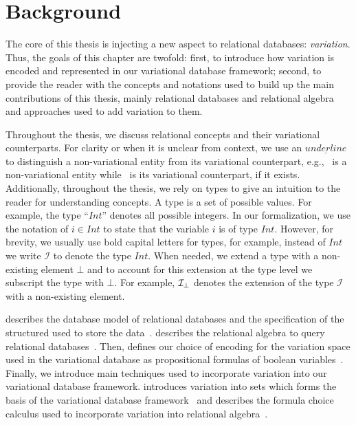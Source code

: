 \chapter{Background}
\label{ch:bg}

The core of this thesis is injecting a new aspect to relational databases: \emph{variation}.
Thus, the goals of this chapter are twofold: 
%
first, to introduce how variation is encoded and represented in our variational database framework;
%
second, to provide the reader with the concepts and notations
used to build up the main contributions of this thesis, mainly relational databases and
relational algebra
%
and approaches used to add variation to them.

%
Throughout the thesis, we discuss relational concepts and their
variational counterparts. 
For clarity or when it is unclear from context, we use
an $\underline{underline}$ to distinguish a non-variational entity
from its variational counterpart,
e.g., \pElem\ is a 
non-variational entity while \elem\ is its variational counterpart,
if it exists.
%
Additionally, throughout the thesis, we rely on types to give an intuition to the reader for
understanding concepts. A type is a set of possible values. For example, the type ``$\mathit{Int}$''
denotes all possible integers. In our formalization, we use the notation of $i \in \mathit{Int}$ to
state that the variable $i$ is of type $\mathit{Int}$. However, for brevity, we usually use 
bold capital letters for types, for example, instead of $\mathit{Int}$ we write $\mathcal{I}$ to denote the type $\mathit{Int}$.
%
When needed, we extend a type with a non-existing element $\bot$ and to account for this
extension at the type level we subscript the type with $\bot$. For example, $\maybe {\mathcal{I}}$
denotes the extension of the type $\mathcal{I}$ with a non-existing element.


%
 describes the database model of relational databases and the specification of
the structured used to store the data~\cite{AliceBook}. 
 describes the relational algebra to query relational databases~\cite{AliceBook}.
%
Then, 
 defines our choice of encoding for the variation space used in the 
variational database as propositional formulas of boolean variables~\cite{ATW18poly,ATW17dbpl}.
%
Finally, we introduce main techniques used to incorporate variation into our variational 
database framework.
 introduces variation into sets which forms the basis of the variational database
framework~\cite{EWC13fosd,Walk14onward,ATW17dbpl} 
and  describes the formula choice calculus used to incorporate 
variation into relational algebra~\cite{HW16fosd}.



%




